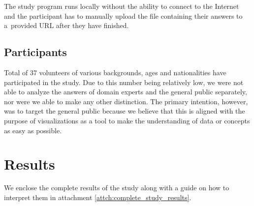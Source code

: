The study program runs locally without the ability to connect to the Internet and the participant has to manually upload the file containing their answers to a~provided URL after they have finished.

\subsection{Participants}
\label{subsec:user_study-setting-participants}

Total of 37 volunteers of various backgrounds, ages and nationalities have participated in the study. Due to this number being relatively low, we were not able to analyze the answers of domain experts and the general public separately, nor were we able to make any other distinction. The primary intention, however, was to target the general public because we believe that this is aligned with the purpose of visualizations as a tool to make the understanding of data or concepts as easy as possible.

\section{Results}
\label{sec:user_study-results}

We enclose the complete results of the study along with a guide on how to interpret them in attachment \ref{attch:complete_study_results}.